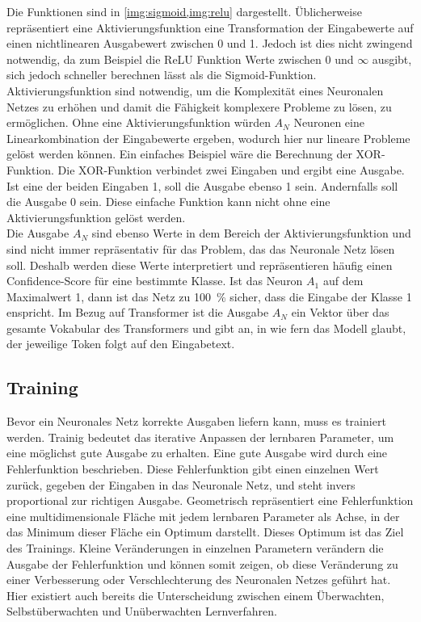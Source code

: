 Die Funktionen sind in \cref{img:sigmoid,img:relu} dargestellt.
Üblicherweise repräsentiert eine Aktivierungsfunktion eine Transformation der Eingabewerte auf einen nichtlinearen Ausgabewert zwischen 0 und 1.
Jedoch ist dies nicht zwingend notwendig, da zum Beispiel die ReLU Funktion Werte zwischen 0 und $\infty$ ausgibt, sich jedoch schneller berechnen lässt als die Sigmoid-Funktion.
Aktivierungsfunktion sind notwendig, um die Komplexität eines Neuronalen Netzes zu erhöhen und damit die Fähigkeit komplexere Probleme zu lösen, zu ermöglichen.
Ohne eine Aktivierungsfunktion würden $A_N$ Neuronen eine Linearkombination der Eingabewerte ergeben, wodurch hier nur lineare Probleme gelöst werden können.
Ein einfaches Beispiel wäre die Berechnung der XOR-Funktion.
Die XOR-Funktion verbindet zwei Eingaben und ergibt eine Ausgabe. Ist eine der beiden Eingaben 1, soll die Ausgabe ebenso 1 sein.
Andernfalls soll die Ausgabe 0 sein.
Diese einfache Funktion kann nicht ohne eine Aktivierungsfunktion gelöst werden.\\

Die Ausgabe $A_N$ sind ebenso Werte in dem Bereich der Aktivierungsfunktion und sind nicht immer repräsentativ für das Problem, das das Neuronale Netz lösen soll.
Deshalb werden diese Werte interpretiert und repräsentieren häufig einen Confidence-Score für eine bestimmte Klasse.
Ist das Neuron $A_1$ auf dem Maximalwert 1, dann ist das Netz zu \SI{100}{\percent} sicher, dass die Eingabe der Klasse 1 enspricht.
Im Bezug auf Transformer ist die Ausgabe $A_N$ ein Vektor über das gesamte Vokabular des Transformers und gibt an, in wie fern das Modell glaubt, der jeweilige Token folgt auf den Eingabetext.\\

\subsection{Training}\label{subsec:grundlagen:training}
Bevor ein Neuronales Netz korrekte Ausgaben liefern kann, muss es trainiert werden.
Trainig bedeutet das iterative Anpassen der lernbaren Parameter, um eine möglichst gute Ausgabe zu erhalten.
Eine gute Ausgabe wird durch eine Fehlerfunktion beschrieben.
Diese Fehlerfunktion gibt einen einzelnen Wert zurück, gegeben der Eingaben in das Neuronale Netz, und steht invers proportional zur richtigen Ausgabe.
Geometrisch repräsentiert eine Fehlerfunktion eine multidimensionale Fläche mit jedem lernbaren Parameter als Achse, in der das Minimum dieser Fläche ein Optimum darstellt.
Dieses Optimum ist das Ziel des Trainings.
Kleine Veränderungen in einzelnen Parametern verändern die Ausgabe der Fehlerfunktion und können somit zeigen, ob diese Veränderung zu einer Verbesserung oder Verschlechterung des Neuronalen Netzes geführt hat.
Hier existiert auch bereits die Unterscheidung zwischen einem Überwachten, Selbstüberwachten und Unüberwachten Lernverfahren.\\

